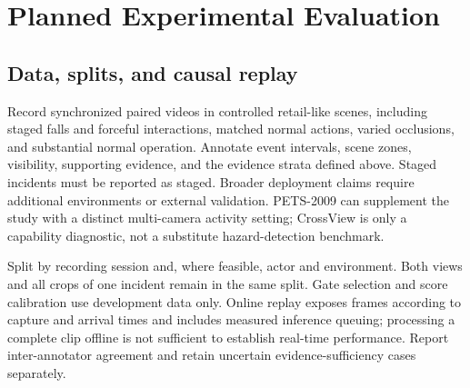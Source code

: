 \documentclass[10pt,a4paper]{article}
\begin{document}
\newpage
\section{Planned Experimental Evaluation}
\subsection{Data, splits, and causal replay}
Record synchronized paired videos in controlled retail-like scenes, including staged falls and forceful interactions, matched normal actions, varied occlusions, and substantial normal operation. Annotate event intervals, scene zones, visibility, supporting evidence, and the evidence strata defined above. Staged incidents must be reported as staged. Broader deployment claims require additional environments or external validation. PETS-2009 can supplement the study with a distinct multi-camera activity setting; CrossView is only a capability diagnostic, not a substitute hazard-detection benchmark.

Split by recording session and, where feasible, actor and environment. Both views and all crops of one incident remain in the same split. Gate selection and score calibration use development data only. Online replay exposes frames according to capture and arrival times and includes measured inference queuing; processing a complete clip offline is not sufficient to establish real-time performance. Report inter-annotator agreement and retain uncertain evidence-sufficiency cases separately.
\end{document}
